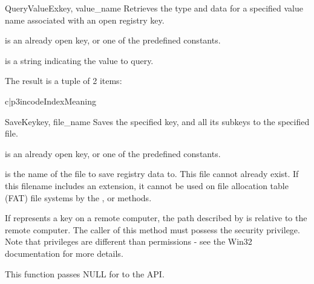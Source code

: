 \begin{funcdesc}{QueryValueEx}{key, value_name}
  Retrieves the type and data for a specified value name associated with 
  an open registry key.
  
  is an already open key, or one of the predefined 
  constants.

  is a string indicating the value to query.

 The result is a tuple of 2 items:

 \begin{tableii}{c|p{3in}}{code}{Index}{Meaning}
 \end{tableii}
\end{funcdesc}


\begin{funcdesc}{SaveKey}{key, file_name}
  Saves the specified key, and all its subkeys to the specified file.

  is an already open key, or one of the predefined 
  constants.

  is the name of the file to save registry data to.
  This file cannot already exist. If this filename includes an extension,
  it cannot be used on file allocation table (FAT) file systems by the
  ,  or 
   methods.

 If  represents a key on a remote computer, the path 
 described by  is relative to the remote computer.
 The caller of this method must possess the  
 security privilege.  Note that privileges are different than permissions 
 - see the Win32 documentation for more details.
 
 This function passes NULL for  to the API.
\end{funcdesc}


